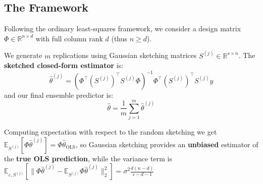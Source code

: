 \documentclass[
11pt,notheorems,hyperref={pdfauthor=whatever}
]{beamer}
\begin{document}
\subsection{The Framework}
\begin{frame}
    Following the ordinary least-squares framework, we consider a design matrix \(\Phi \in \mathbb{R}^{n \times d}\) with full column rank \(d\) (thus \(n \ge d\)). 
    
    We generate \(m\) replications using Gaussian sketching matrices \(S^{(j)} \in \mathbb{R}^{s \times n}\). The \alert{\textbf{sketched closed-form estimator}} is:
    \[
        \hat{\theta}^{(j)} = (\Phi^\top(S^{(j)})^\top S^{(j)}\Phi)^{-1}\Phi^\top(S^{(j)})^\top S^{(j)}y
    \]
    and our final ensemble predictor is:
    \[
        \hat{\theta} = \frac{1}{m} \sum_{j=1}^m \hat{\theta}^{(j)}
    \]
    
    Computing expectation with respect to the random sketching we get \(\mathbb{E}_{S^{(j)}}[\Phi\hat{\theta}^{(j)}] = \Phi\hat{\theta}_{\text{OLS}}\), so Gaussian sketching provides an \alert{\textbf{unbiased}} estimator of the \alert{\textbf{true OLS prediction}}, while the variance term is \(\mathbb{E}_{\varepsilon, S^{(j)}}\left[ \big\|\Phi\hat{\theta}^{(j)} - \mathbb{E}_{S^{(j)}}\Phi\hat{\theta}^{(j)}\big\|_2^2 \right] = \sigma^2 \frac{d(n-d)}{s-d-1}\)
\end{frame}
\end{document}
